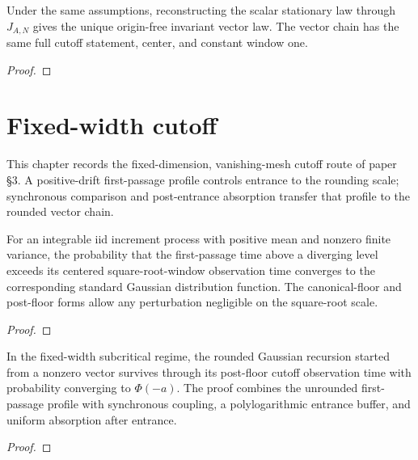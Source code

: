 \begin{corollary}
  \label{cor:gaussian-vector-cutoff}
  \leanok
  Under the same assumptions, reconstructing the scalar stationary law
  through $J_{A,N}$ gives the unique origin-free invariant vector law.  The
  vector chain has the same full cutoff statement, center, and constant window
  one.
\end{corollary}
\begin{proof}\leanok\end{proof}

\chapter{Fixed-width cutoff}

This chapter records the fixed-dimension, vanishing-mesh cutoff route of paper
§3.  A positive-drift first-passage profile controls entrance to the rounding
scale; synchronous comparison and post-entrance absorption transfer that profile
to the rounded vector chain.

\begin{theorem}
  \label{thm:positive-drift-first-passage-profile}
  \leanok
  For an integrable iid increment process with positive mean and nonzero finite
  variance, the probability that the first-passage time above a diverging level
  exceeds its centered square-root-window observation time converges to the
  corresponding standard Gaussian distribution function.  The canonical-floor
  and post-floor forms allow any perturbation negligible on the square-root
  scale.
\end{theorem}
\begin{proof}\leanok\end{proof}

\begin{theorem}
  \label{thm:fixed-width-rounded-survival}
  \leanok
  In the fixed-width subcritical regime, the rounded Gaussian recursion started
  from a nonzero vector survives through its post-floor cutoff observation time
  with probability converging to $\Phi(-a)$.  The proof combines the unrounded
  first-passage profile with synchronous coupling, a polylogarithmic entrance
  buffer, and uniform absorption after entrance.
\end{theorem}
\begin{proof}\leanok{}\end{proof}

